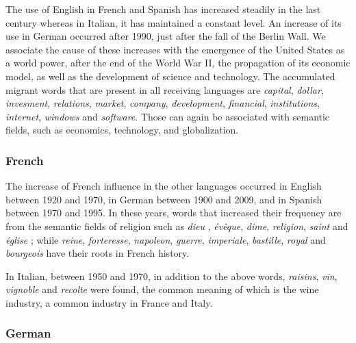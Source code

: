 \documentclass[10pt,letterpaper]{article} %
\begin{document}
The use of English in French and Spanish has increased steadily in the last century
whereas in Italian, it has maintained a constant level. 
An increase of its use in German occurred after 1990, just after the fall of the Berlin Wall. We associate the cause of these increases
with the emergence of the United States as a world power, after the end of the
World War II, the propagation of its economic model, as well as the development
of science and technology. The accumulated migrant words that are present in all receiving
languages are \textit{capital}, \textit{dollar}, \textit{invesment},
\textit{relations}, \textit{market}, \textit{company}, \textit{development},
\textit{financial},  \textit{institutions}, \textit{internet}, \textit{windows}
and \textit{software}. Those can again be associated with semantic fields, such
as economics, technology, and globalization.

\subsubsection*{French} %

The increase of French influence in the other languages occurred in
English between 1920 and 1970, in German between 1900 and 2009, and in Spanish
between 1970 and 1995. In these years, words that increased their frequency
are from the semantic fields of religion such as \textit{dieu} ,
\textit{évêque}, \textit{dime}, \textit{religion}, \textit{saint} and
\textit{église} ; while \textit{reine}, \textit{forteresse},
\textit{napoleon}, \textit{guerre}, \textit{imperiale}, \textit{bastille},
\textit{royal} and \textit{bourgeois} have their roots in French history.

In Italian, between 1950 and 1970, in addition to the above
words, \textit{raisins}, \textit{vin}, \textit{vignoble} and \textit{recolte} were
found, the common meaning of which is the wine industry, a common industry in
France and Italy.

\subsubsection*{German} %
\end{document}
